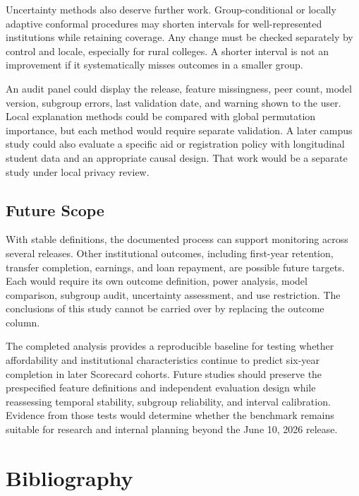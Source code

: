 \documentclass[12pt,a4paper]{article}
\begin{document}
Uncertainty methods also deserve further work. Group-conditional or locally adaptive conformal procedures may shorten intervals for well-represented institutions while retaining coverage. Any change must be checked separately by control and locale, especially for rural colleges. A shorter interval is not an improvement if it systematically misses outcomes in a smaller group.

An audit panel could display the release, feature missingness, peer count, model version, subgroup errors, last validation date, and warning shown to the user. Local explanation methods could be compared with global permutation importance, but each method would require separate validation. A later campus study could also evaluate a specific aid or registration policy with longitudinal student data and an appropriate causal design. That work would be a separate study under local privacy review.

\subsection{Future Scope}

With stable definitions, the documented process can support monitoring across several releases. Other institutional outcomes, including first-year retention, transfer completion, earnings, and loan repayment, are possible future targets. Each would require its own outcome definition, power analysis, model comparison, subgroup audit, uncertainty assessment, and use restriction. The conclusions of this study cannot be carried over by replacing the outcome column.

The completed analysis provides a reproducible baseline for testing whether affordability and institutional characteristics continue to predict six-year completion in later Scorecard cohorts. Future studies should preserve the prespecified feature definitions and independent evaluation design while reassessing temporal stability, subgroup reliability, and interval calibration. Evidence from those tests would determine whether the benchmark remains suitable for research and internal planning beyond the June 10, 2026 release.

\clearpage
\section*{Bibliography}

\begingroup
\singlespacing
\setlength{\parindent}{-0.5in}
\setlength{\leftskip}{0.5in}
\setlength{\parskip}{0.55em}
\end{document}
